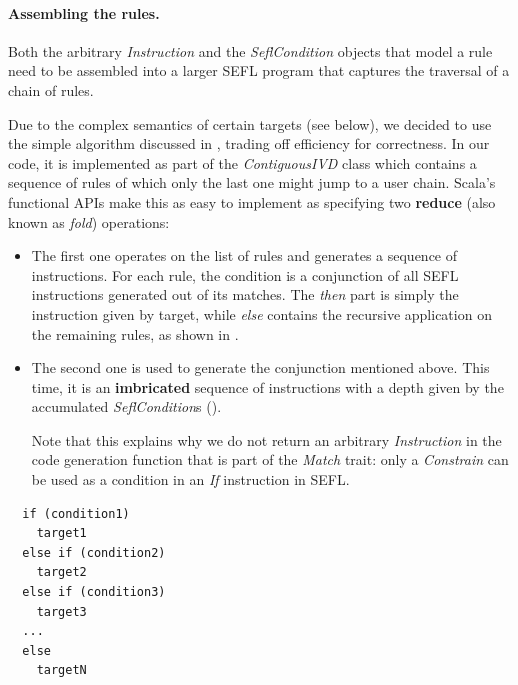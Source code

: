 {\paragraph{Assembling the rules.}
Both the arbitrary \emph{Instruction} and the \emph{SeflCondition} objects that
model a rule need to be assembled into a larger SEFL program that captures the
traversal of a chain of rules.

Due to the complex semantics of certain targets (see below), we decided to use
the simple algorithm discussed in ,
trading off efficiency for correctness.  In our code, it is implemented as part
of the \emph{ContiguousIVD} class which contains a sequence of rules of which
only the last one might jump to a user chain.  Scala's functional APIs make
this as easy to implement as specifying two \textbf{reduce} (also known as
\emph{fold}) operations:
\begin{itemize}
  \item The first one operates on the list of rules and generates a sequence of
     instructions.  For each rule, the condition is a
    conjunction of all SEFL instructions generated out of its matches.  The
    \emph{then} part is simply the instruction given by target, while
    \emph{else} contains the recursive application on the remaining rules, as
    shown in .

  \item The second one is used to generate the conjunction mentioned above.
    This time, it is an \textbf{imbricated} sequence of 
    instructions with a depth given by the accumulated \emph{SeflCondition}s
    ().

    Note that this explains why we do not return an arbitrary
    \emph{Instruction} in the code generation function that is part of the
    \emph{Match} trait: only a \emph{Constrain} can be used as a condition in
    an \emph{If} instruction in SEFL.
\end{itemize}

\begin{minipage}[t]{.45\textwidth}
  \begin{listing}[H]
    \lstset{numbers=none, frame=single}
    \begin{lstlisting}
  if (condition1)
    target1
  else if (condition2)
    target2
  else if (condition3)
    target3
  ...
  else
    targetN
    \end{lstlisting}


\end{listing}
\end{minipage}}
